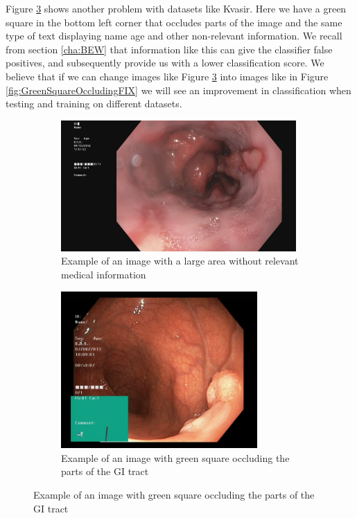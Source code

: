 Figure \ref{fig:GreenSquareOccluding} shows another problem with datasets like Kvasir.  Here we have a green square in the bottom left corner that occludes parts of the image and the same type of text displaying name age and other non-relevant information. We recall from section \ref{cha:BEW} that information like this can give the classifier false positives, and subsequently provide us with a lower classification score. 
We believe that if we can change images like Figure \ref{fig:GreenSquareOccluding} into images like in Figure \ref{fig:GreenSquareOccludingFIX} we will see an improvement in classification when testing and training on different datasets.


\begin{figure}
     \centering
     \begin{subfigure}[b]{0.4\textwidth}
         \centering
         \includegraphics[height=5cm,width=\textwidth]{experiments/figures/leftframe.jpg}
         \caption{Example of an image with a large area without relevant medical information}
         \label{fig:LargeLeftBlack}
     \end{subfigure}
     \hfill
     \begin{subfigure}[b]{0.4\textwidth}
         \centering
         \includegraphics[height=6cm,width=\textwidth]{experiments/figures/greenframe.jpg}
         \caption{Example of an image with green square occluding the parts of the GI tract}
         \label{fig:GreenSquareOccluding}
     \end{subfigure}     

\end{figure}
